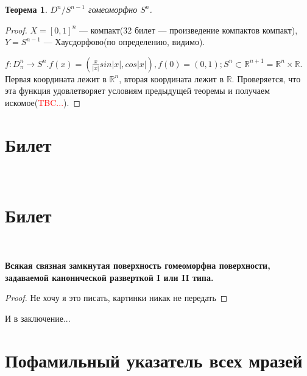 \documentclass[a4paper,100pt]{article}
\theoremstyle{indented}
\newtheorem{theorem}{Теорема}
\begin{document}
     \begin{theorem}
         $D^n/S^{n-1}$ гомеоморфно $S^n$.
     \end{theorem}
     
     \begin{proof}
         $X = [0,1]^n$ --- компакт(32 билет --- произведение компактов компакт), $Y = S^{n-1}$ --- Хаусдорфово(по определению, видимо). 
         
         $f:D_{\pi}^n \rightarrow S^n. f(x) = (\frac{x}{|x|}sin|x|, cos|x|), f(0) = (0,1) ;S^n \subset \mathbb R^{n+1} = \mathbb R^n \times \mathbb R$. Первая координата лежит в $\mathbb R^n$, вторая координата лежит в $\mathbb R$. Проверяется, что эта функция удовлетворяет условиям предыдущей теоремы и получаем искомое(\textcolor{red}{TBC...}).  
     \end{proof}

\section{Билет} \

\medskip

\section{Билет} \

\medskip

\textbf{Всякая связная замкнутая поверхность гомеоморфна поверхности, задаваемой канонической разверткой I или II типа.}\\

\begin{proof}
    Не хочу я это писать, картинки никак не передать
\end{proof}


\newpage

\hypertarget{t2}{И в заключение...}



\section{Пофамильный указатель всех мразей}
\end{document}

